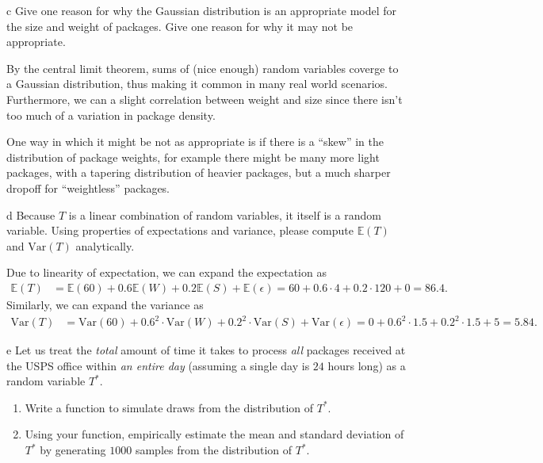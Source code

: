 \documentclass[expanded]{lkx_pset}
\begin{document}
\begin{parts}
  \begin{part}{c}
     Give one reason for why the Gaussian distribution is an appropriate model for the size and weight of packages. Give one reason for why it may not be appropriate.
  \end{part}

  By the central limit theorem, sums of (nice enough) random variables coverge to a Gaussian distribution, thus making it common in many real world scenarios. Furthermore, we can a slight correlation between weight and size since there isn't too much of a variation in package density.

  One way in which it might be not as appropriate is if there is a ``skew'' in the distribution of package weights, for example there might be many more light packages, with a tapering distribution of heavier packages, but a much sharper dropoff for ``weightless'' packages.

  \begin{part}{d}
    Because $T$ is a linear combination of random variables, it itself is a random variable. Using properties of expectations and variance, please compute $\mathbb{E}(T)$ and $\mathrm{Var}(T)$ analytically.
  \end{part}

  Due to linearity of expectation, we can expand the expectation as
  \[
    \begin{aligned}
      \mathbb{E}(T) &= \mathbb{E}(60)+0.6\mathbb{E}(W) + 0.2\mathbb{E}(S)+\mathbb{E}(\epsilon) = 60+0.6\cdot 4 + 0.2\cdot 120 + 0 = 86.4.
    \end{aligned}
  \]
  Similarly, we can expand the variance as 
  \[
    \begin{aligned}
      \mathrm{Var}(T) &= \mathrm{Var}(60)+0.6^2\cdot \mathrm{Var}(W) + 0.2^2\cdot \mathrm{Var}(S)+\mathrm{Var}(\epsilon) = 0 + 0.6^2\cdot 1.5 + 0.2^2\cdot 1.5 + 5 = 5.84.
    \end{aligned}
  \]

  \begin{part}{e}
     Let us treat the \textit{total} amount of time it takes to process \textit{all} packages received at the USPS office within \textit{an entire day} (assuming a single day is $24$ hours long) as a random variable $T^{*}$. 
    \begin{enumerate}
        \item Write a function to simulate draws from the distribution of $T^{*}$. 
        \item Using your function, empirically estimate the mean and standard deviation of $T^{*}$ by generating $1000$ samples from the distribution of $T^{*}$.
    \end{enumerate}
  \end{part}


\end{parts}
\end{document}
